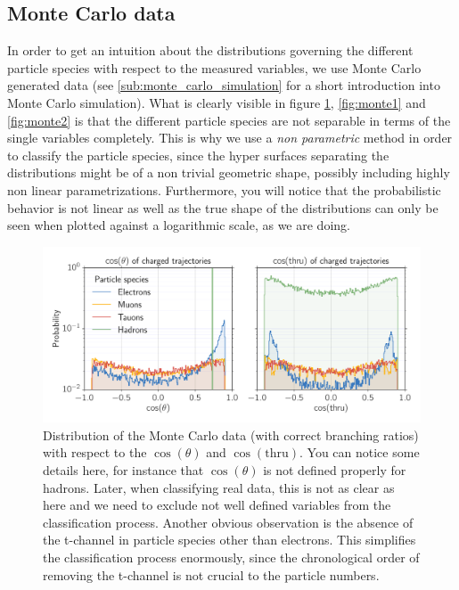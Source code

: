 \clearpage
\subsection{Monte Carlo data}

\label{sub:montecarlo}
In order to get an intuition about the distributions governing the different particle species with respect to the measured
variables, we use Monte Carlo generated data (see \ref{sub:monte_carlo_simulation} for a short introduction into Monte Carlo
simulation). What is clearly visible in figure \ref{fig:cos_figs}, \ref{fig:monte1} and \ref{fig:monte2} is that the
different particle species are not separable in terms of the single variables completely. This is why we use a 
\textit{non parametric} method in order to classify the particle species, since the hyper surfaces separating the distributions
might be of a non trivial geometric shape, possibly including highly non linear parametrizations. Furthermore, you will notice
that the probabilistic behavior is not linear as well as the true shape of the distributions can only be seen when plotted
against a logarithmic scale, as we are doing.
\begin{figure}[htpb]
    \centering
    \includegraphics[width=1.0\linewidth]{figures/cos_figs}
    \caption{Distribution of the Monte Carlo data (with correct branching ratios) 
    with respect to the $\cos(\theta)$ and $\cos(\mathrm{thru})$. You can
    notice some details here, for instance that $\cos(\theta)$ is not defined properly for hadrons. Later, when classifying
    real data, this is not as clear as here and we need to exclude not well defined variables from the classification process.
    Another obvious observation is the absence of the t-channel in particle species other than electrons. This simplifies 
    the classification process enormously, since the chronological 
order of removing the t-channel is not crucial to the particle numbers.}
    \label{fig:cos_figs}
\end{figure}

